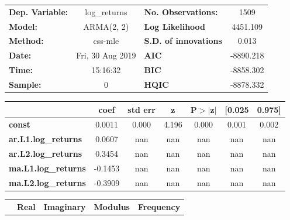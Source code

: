 \begin{center}
\begin{tabular}{lclc}
\toprule
\textbf{Dep. Variable:}     &        log\_returns       & \textbf{  No. Observations:  } &            1509            \\
\textbf{Model:}             &         ARMA(2, 2)        & \textbf{  Log Likelihood     } &          4451.109          \\
\textbf{Method:}            &          css-mle          & \textbf{  S.D. of innovations} &           0.013            \\
\textbf{Date:}              &      Fri, 30 Aug 2019     & \textbf{  AIC                } &         -8890.218          \\
\textbf{Time:}              &          15:16:32         & \textbf{  BIC                } &         -8858.302          \\
\textbf{Sample:}            &             0             & \textbf{  HQIC               } &         -8878.332          \\
\bottomrule
\end{tabular}
\begin{tabular}{lcccccc}
                            & \textbf{coef} & \textbf{std err} & \textbf{z} & \textbf{P$> |$z$|$} & \textbf{[0.025} & \textbf{0.975]}  \\
\midrule
\textbf{const}              &       0.0011  &        0.000     &     4.196  &         0.000        &        0.001    &        0.002     \\
\textbf{ar.L1.log\_returns} &       0.0607  &          nan     &       nan  &           nan        &          nan    &          nan     \\
\textbf{ar.L2.log\_returns} &       0.3454  &          nan     &       nan  &           nan        &          nan    &          nan     \\
\textbf{ma.L1.log\_returns} &      -0.1453  &          nan     &       nan  &           nan        &          nan    &          nan     \\
\textbf{ma.L2.log\_returns} &      -0.3909  &          nan     &       nan  &           nan        &          nan    &          nan     \\
\bottomrule
\end{tabular}
\begin{tabular}{lcccc}
              & \textbf{            Real} & \textbf{         Imaginary} & \textbf{         Modulus} & \textbf{        Frequency}  \\

\end{tabular}
\end{center}
